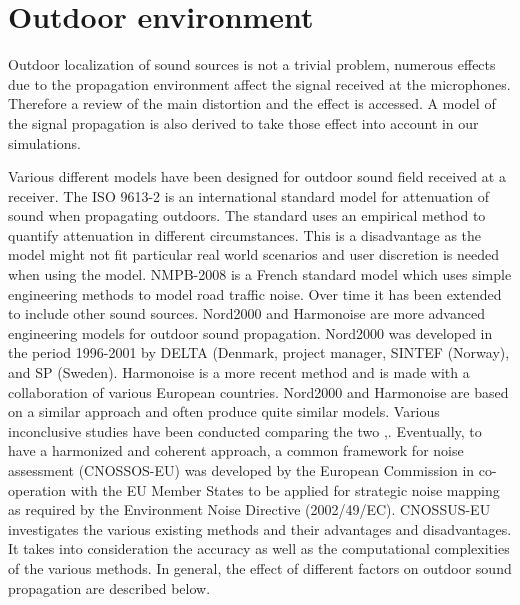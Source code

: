 \section{Outdoor environment}

Outdoor localization of sound sources is not a trivial problem, numerous effects due to the propagation environment affect the signal received at the microphones. Therefore a review of the main distortion and the effect is accessed. A model of the signal propagation is also derived to take those effect into account in our simulations. 

Various different models have been designed for outdoor sound field received at a receiver. The ISO 9613-2 \cite{ISO9613} is an international standard model for attenuation of sound when propagating outdoors. The standard uses an empirical method to quantify attenuation in different circumstances. This is a disadvantage as the model might not fit particular real world scenarios and user discretion is needed when using the model. NMPB-2008 \cite{dutilleux2010nmpb} is a French standard model which uses simple engineering methods to model road traffic noise. Over time it has been extended to include other sound sources. Nord2000 \cite{plovsing2000nord2000} and Harmonoise \cite{defrance2007outdoor} are more advanced engineering models for outdoor sound propagation. Nord2000 was developed in the period 1996-2001 by DELTA (Denmark, project manager, SINTEF (Norway), and SP (Sweden). Harmonoise is a more recent method and is made with a collaboration of various European countries. Nord2000 and Harmonoise are based on a similar approach and often produce quite similar models. Various inconclusive studies have been conducted comparing the two \cite{garg2014critical},\cite{jonsson2008comparison}. Eventually, to have a harmonized and coherent approach, a common framework for noise assessment (CNOSSOS-EU) was developed by the European Commission \cite{kephalopoulos2012common} in co-operation with the EU Member States to be applied for strategic noise mapping as required by the Environment Noise Directive (2002/49/EC). CNOSSUS-EU investigates the various existing methods and their advantages and disadvantages. It takes into consideration the accuracy as well as the computational complexities of the various methods. In general, the effect of different factors on outdoor sound propagation are described below.

